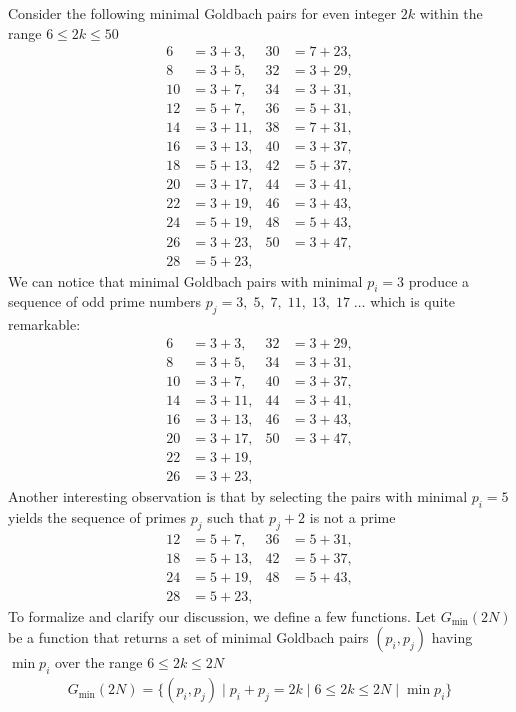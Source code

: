 Consider the following minimal Goldbach pairs for even integer $2k$ within the range $6 \leq 2k \leq 50$
\begin{align*}
    6  &= 3 + 3,   & 30 &= 7 + 23, \\
    8  &= 3 + 5,   & 32 &= 3 + 29, \\
    10 &= 3 + 7,   & 34 &= 3 + 31, \\
    12 &= 5 + 7,   & 36 &= 5 + 31, \\
    14 &= 3 + 11,  & 38 &= 7 + 31, \\
    16 &= 3 + 13,  & 40 &= 3 + 37, \\
    18 &= 5 + 13,  & 42 &= 5 + 37, \\
    20 &= 3 + 17,  & 44 &= 3 + 41, \\
    22 &= 3 + 19,  & 46 &= 3 + 43, \\
    24 &= 5 + 19,  & 48 &= 5 + 43, \\
    26 &= 3 + 23,  & 50 &= 3 + 47, \\
    28 &= 5 + 23,  &
\end{align*}
We can notice that minimal Goldbach pairs with minimal $p_i=3$ produce a sequence of odd prime numbers
$p_j = 3, \; 5, \; 7, \; 11, \; 13, \; 17 \; \dots$ which is quite remarkable:
\begin{align*}
    6  &= 3 + 3,   & 32 &= 3 + 29, \\
    8  &= 3 + 5,   & 34 &= 3 + 31, \\
    10 &= 3 + 7,   & 40 &= 3 + 37, \\
    14 &= 3 + 11,  & 44 &= 3 + 41, \\
    16 &= 3 + 13,  & 46 &= 3 + 43, \\
    20 &= 3 + 17,  & 50 &= 3 + 47, \\
    22 &= 3 + 19,  &              \\
    26 &= 3 + 23,  &
\end{align*}
Another interesting observation is that by selecting the pairs with minimal $p_i=5$ yields
the sequence of primes $p_j$ such that $p_j+2$ is not a prime
\begin{align*}
    12 &= 5 + 7,   & 36 &= 5 + 31, \\
    18 &= 5 + 13,  & 42 &= 5 + 37, \\
    24 &= 5 + 19,  & 48 &= 5 + 43, \\
    28 &= 5 + 23,  &
\end{align*}
To formalize and clarify our discussion, we define a few functions.
Let $G_{\min} (2N)$ be a function that returns a set of minimal Goldbach pairs $(p_i, p_j)$ having $\min p_i$
over the range $6 \leq 2k \leq 2N$
\begin{align*}
    G_{\min} (2N) = \{(p_i, p_j) \mid p_i + p_j = 2k \mid 6 \leq 2k \leq 2N \mid \min p_i \}
\end{align*}

